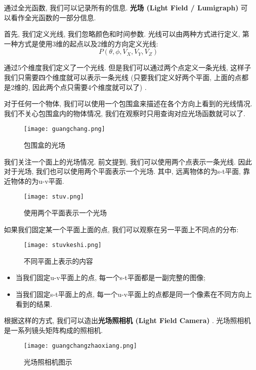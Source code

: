 \documentclass[openany]{progbookcn}
\begin{document}
通过全光函数, 我们可以记录所有的信息. \textbf{光场 (Light Field / Lumigraph) }可以看作全光函数的一部分信息. 

首先, 我们定义光线, 我们忽略颜色和时间参数. 光线可以由两种方式进行定义, 第一种方式是使用3维的起点以及2维的方向定义光线: 
\begin{equation}
	P(\theta,\phi,V_X,V_Y,V_Z)
\end{equation}

通过5个维度我们定义了一个光线. 但是我们可以通过两个点定义一条光线, 这样子我们只需要四个维度就可以表示一条光线 (只要我们定义好两个平面, 上面的点都是2维的, 因此两个点只需要4个维度就可以了) . 

对于任何一个物体, 我们可以使用一个包围盒来描述在各个方向上看到的光线情况. 我们不关心包围盒内的物体情况, 我们在观察时只用查询对应光场函数就可以了. 

\begin{figure}[H]
	\centering
	\texttt{[image: guangchang.png]}
	\caption{包围盒的光场}
	\label{fig:guangchang}
\end{figure}

我们关注一个面上的光场情况. 前文提到, 我们可以使用两个点表示一条光线. 因此对于光场, 我们也可以使用两个平面表示一个光场. 其中, 远离物体的为s-t平面, 靠近物体的为u-v平面. 

\begin{figure}[H]
	\centering
	\texttt{[image: stuv.png]}
	\caption{使用两个平面表示一个光场}
	\label{fig:stuv}
\end{figure}

如果我们固定某一个平面上面的点, 我们可以观察在另一平面上不同点的分布: 

\begin{figure}[H]
	\centering
	\texttt{[image: stuvkeshi.png]}
	\caption{不同平面上表示的内容}
	\label{fig:stuvkeshi}
\end{figure}

\begin{itemize}
	\item 当我们固定u-v平面上的点, 每一个s-t平面都是一副完整的图像; 
	\item 当我们固定s-t平面上的点, 每一个u-v平面上的点都是同一个像素在不同方向上看到的结果. 
\end{itemize}

根据这样的方式, 我们可以造出\textbf{光场照相机 (Light Field Camera) }. 光场照相机是一系列镜头矩阵构成的照相机. 

\begin{figure}[H]
	\centering
	\texttt{[image: guangchangzhaoxiang.png]}
	\caption{光场照相机图示}
	\label{fig:guangchangzhaoxiang}
\end{figure}
\end{document}
